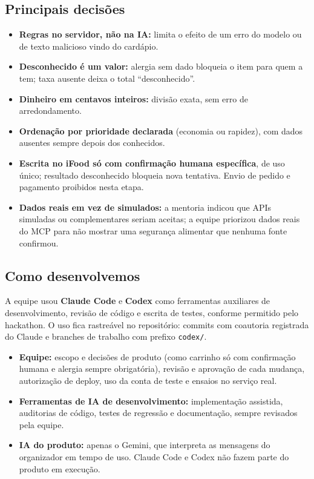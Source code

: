 \documentclass[11pt,a4paper]{article}
\begin{document}
\subsection{Principais decisões}
\begin{itemize}
  \item \textbf{Regras no servidor, não na IA:} limita o efeito de um erro do modelo ou de texto malicioso vindo do cardápio.
  \item \textbf{Desconhecido é um valor:} alergia sem dado bloqueia o item para quem a tem; taxa ausente deixa o total ``desconhecido''.
  \item \textbf{Dinheiro em centavos inteiros:} divisão exata, sem erro de arredondamento.
  \item \textbf{Ordenação por prioridade declarada} (economia ou rapidez), com dados ausentes sempre depois dos conhecidos.
  \item \textbf{Escrita no iFood só com confirmação humana específica}, de uso único; resultado desconhecido bloqueia nova tentativa. Envio de pedido e pagamento proibidos nesta etapa.
  \item \textbf{Dados reais em vez de simulados:} a mentoria indicou que APIs simuladas ou complementares seriam aceitas; a equipe priorizou dados reais do MCP para não mostrar uma segurança alimentar que nenhuma fonte confirmou.
\end{itemize}

\subsection{Como desenvolvemos}
A equipe usou \textbf{Claude Code} e \textbf{Codex} como ferramentas auxiliares de desenvolvimento, revisão de código e escrita de testes, conforme permitido pelo hackathon. O uso fica rastreável no repositório: commits com coautoria registrada do Claude e branches de trabalho com prefixo \texttt{codex/}.
\begin{itemize}
  \item \textbf{Equipe:} escopo e decisões de produto (como carrinho só com confirmação humana e alergia sempre obrigatória), revisão e aprovação de cada mudança, autorização de deploy, uso da conta de teste e ensaios no serviço real.
  \item \textbf{Ferramentas de IA de desenvolvimento:} implementação assistida, auditorias de código, testes de regressão e documentação, sempre revisados pela equipe.
  \item \textbf{IA do produto:} apenas o Gemini, que interpreta as mensagens do organizador em tempo de uso. Claude Code e Codex não fazem parte do produto em execução.
\end{itemize}
\end{document}
